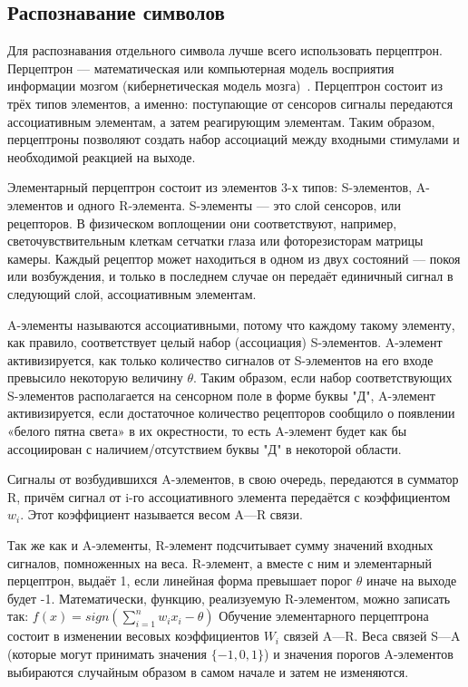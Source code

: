 \subsection{Распознавание символов}
\label{sub:domain:imagerecognition}
Для распознавания отдельного символа лучше всего использовать перцептрон.
Перцептрон — математическая или компьютерная модель восприятия информации мозгом (кибернетическая модель мозга)~\cite{perceptron}.
Перцептрон состоит из трёх типов элементов, а именно: поступающие от сенсоров сигналы передаются ассоциативным элементам, а затем реагирующим элементам. Таким образом, перцептроны позволяют создать набор ассоциаций между входными стимулами и необходимой реакцией на выходе.

Элементарный перцептрон состоит из элементов 3-х типов: S-элементов, A-элементов и одного R-элемента. S-элементы — это слой сенсоров, или рецепторов. В физическом воплощении они соответствуют, например, светочувствительным клеткам сетчатки глаза или фоторезисторам матрицы камеры. Каждый рецептор может находиться в одном из двух состояний — покоя или возбуждения, и только в последнем случае он передаёт единичный сигнал в следующий слой, ассоциативным элементам.

A-элементы называются ассоциативными, потому что каждому такому элементу, как правило, соответствует целый набор (ассоциация) S-элементов. A-элемент активизируется, как только количество сигналов от S-элементов на его входе превысило некоторую величину $\theta$. Таким образом, если набор соответствующих S-элементов располагается на сенсорном поле в форме буквы "Д", A-элемент активизируется, если достаточное количество рецепторов сообщило о появлении «белого пятна света» в их окрестности, то есть A-элемент будет как бы ассоциирован с наличием/отсутствием буквы "Д" в некоторой области.

Сигналы от возбудившихся A-элементов, в свою очередь, передаются в сумматор R, причём сигнал от i-го ассоциативного элемента передаётся с коэффициентом $w_i$. Этот коэффициент называется весом A—R связи.

Так же как и A-элементы, R-элемент подсчитывает сумму значений входных сигналов, помноженных на веса. R-элемент, а вместе с ним и элементарный перцептрон, выдаёт 1, если линейная форма превышает порог $\theta$ иначе на выходе будет -1. Математически, функцию, реализуемую R-элементом, можно записать так:
$f(x) = sign(\sum_{i=1}^{n} w_i x_i - \theta)$
Обучение элементарного перцептрона состоит в изменении весовых коэффициентов $W_i$ связей A—R. Веса связей S—A (которые могут принимать значения $\{ -1, 0, 1 \}$) и значения порогов A-элементов выбираются случайным образом в самом начале и затем не изменяются.

